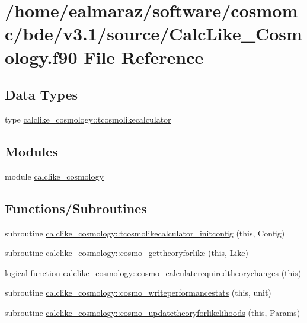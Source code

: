 \hypertarget{CalcLike__Cosmology_8f90}{}\section{/home/ealmaraz/software/cosmomc/bde/v3.1/source/\+Calc\+Like\+\_\+\+Cosmology.f90 File Reference}
\label{CalcLike__Cosmology_8f90}
\subsection*{Data Types}
\begin{DoxyCompactItemize}
\item 
type \mbox{\hyperlink{structcalclike__cosmology_1_1tcosmolikecalculator}{calclike\+\_\+cosmology\+::tcosmolikecalculator}}
\end{DoxyCompactItemize}
\subsection*{Modules}
\begin{DoxyCompactItemize}
\item 
module \mbox{\hyperlink{namespacecalclike__cosmology}{calclike\+\_\+cosmology}}
\end{DoxyCompactItemize}
\subsection*{Functions/\+Subroutines}
\begin{DoxyCompactItemize}
\item 
subroutine \mbox{\hyperlink{namespacecalclike__cosmology_a86c0c49dcb09440792bc5a002f456f57}{calclike\+\_\+cosmology\+::tcosmolikecalculator\+\_\+initconfig}} (this, Config)
\item 
subroutine \mbox{\hyperlink{namespacecalclike__cosmology_a6f159ab28e06f381042c55c451a060a9}{calclike\+\_\+cosmology\+::cosmo\+\_\+gettheoryforlike}} (this, Like)
\item 
logical function \mbox{\hyperlink{namespacecalclike__cosmology_aa5acf9c357eef01f44553072f8327e5e}{calclike\+\_\+cosmology\+::cosmo\+\_\+calculaterequiredtheorychanges}} (this)
\item 
subroutine \mbox{\hyperlink{namespacecalclike__cosmology_a98c01c544a399527119cde828e456b4b}{calclike\+\_\+cosmology\+::cosmo\+\_\+writeperformancestats}} (this, unit)
\item 
subroutine \mbox{\hyperlink{namespacecalclike__cosmology_afcac4304981be0a09f45f15d9194e427}{calclike\+\_\+cosmology\+::cosmo\+\_\+updatetheoryforlikelihoods}} (this, Params)
\end{DoxyCompactItemize}
